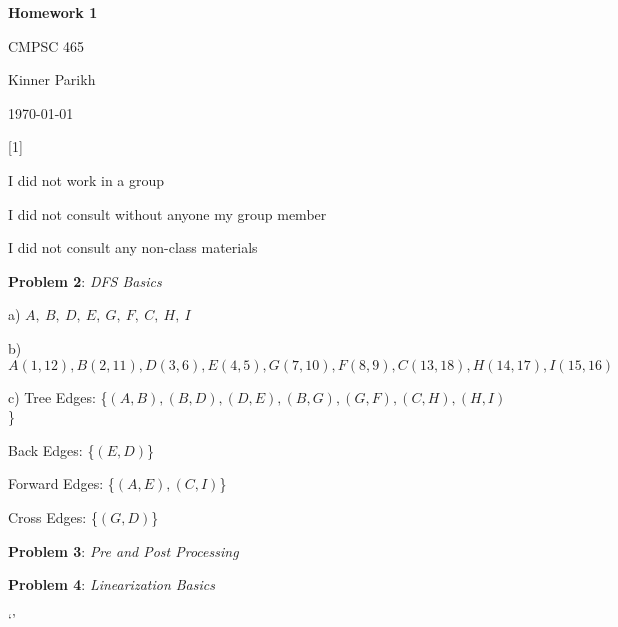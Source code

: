 \documentclass{article} %
\newcommand{\question}[2][]{\begin{flushleft}
        \textbf{Problem #1}: \textit{#2}

\end{flushleft}}
\newcommand{\maketitletwo}[2][]{\begin{center}
        \Large{\textbf{Homework #1}
            
            CMPSC 465} %
        \vspace{5pt}
        
        \normalsize{Kinner Parikh  %
        
        \today}        %
        \vspace{40pt}


        \newpage
        
\end{center}}
\begin{document}
    \maketitletwo[1]  %

    \question[1]{}
    \begin{center}
        
        I did not work in a group
    
        I did not consult without anyone my group member
    
        I did not consult any non-class materials
    \end{center}
    
    \newpage

    \question[2]{DFS Basics}

    a) $A,\ B,\ D,\ E,\ G,\ F,\ C,\ H,\ I$

    \vspace{5pt}

    b) $A(1, 12), B(2, 11), D(3, 6), E(4, 5), G(7, 10), F(8, 9), C(13, 18), H(14, 17), I(15, 16)$

    \vspace{5pt}

    c) Tree Edges: \hspace{16pt}\{$(A, B), (B, D), (D, E), (B, G), (G, F), (C, H), (H, I)$\}

    \hspace{12pt}Back Edges: \hspace{14pt}\{$(E, D)$\}

    \hspace{12pt}Forward Edges: \{$(A, E), (C, I)$\}

    \hspace{12pt}Cross Edges: \hspace{12pt}\{$(G, D)$\}

    \newpage

    \question[3]{Pre and Post Processing}

    \newpage

    \question[4]{Linearization Basics}

    `'

    
\end{document}
